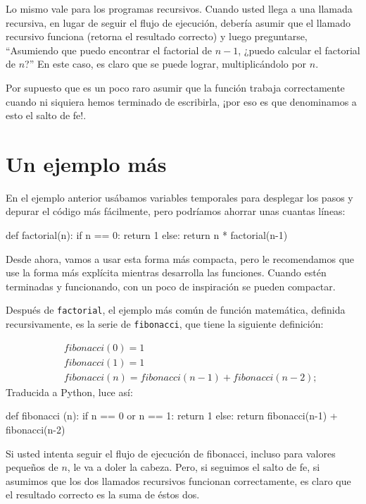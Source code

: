 Lo mismo vale para los programas recursivos. Cuando usted llega a
una llamada recursiva, en lugar de seguir el flujo de ejecución, debería
asumir que el llamado recursivo funciona (retorna el resultado correcto)
y luego preguntarse, ``Asumiendo que puedo encontrar el factorial
de $n-1$, ¿puedo calcular el factorial de $n$?'' En este caso,
es claro que se puede lograr, multiplicándolo por $n$.

Por supuesto que es un poco raro asumir que la función trabaja correctamente
cuando ni siquiera hemos terminado de escribirla, ¡por eso es que
denominamos a esto el salto de fe!.

\section{Un ejemplo más}

\label{one more example}

En el ejemplo anterior usábamos variables temporales para desplegar
los pasos y depurar el código más fácilmente, pero podríamos ahorrar
unas cuantas líneas:

\begin{pythoncode}
def factorial(n):
  if n == 0:
    return 1
  else:
    return n * factorial(n-1)
\end{pythoncode}
 Desde ahora, vamos a usar esta forma más compacta, pero le recomendamos
que use la forma más explícita mientras desarrolla las funciones.
Cuando estén terminadas y funcionando, con un poco de inspiración
se pueden compactar.


Después de \texttt{factorial}, el ejemplo más común de función matemática,
definida recursivamente, es la serie de \texttt{fibonacci}, que tiene
la siguiente definición:

\vspace{-0.25in}
 
\begin{eqnarray*}
 &  & fibonacci(0)=1\\
 &  & fibonacci(1)=1\\
 &  & fibonacci(n)=fibonacci(n-1)+fibonacci(n-2);
\end{eqnarray*}
Traducida a Python, luce así:

\begin{pyconcode}
def fibonacci (n):
  if n == 0 or n == 1:
    return 1
  else:
    return fibonacci(n-1) + fibonacci(n-2)
\end{pyconcode}
 Si usted intenta seguir el flujo de ejecución de fibonacci, incluso
para valores pequeños de $n$, le va a doler la cabeza. Pero, si seguimos
el salto de fe, si asumimos que los dos llamados recursivos funcionan
correctamente, es claro que el resultado correcto es la suma de éstos
dos.

